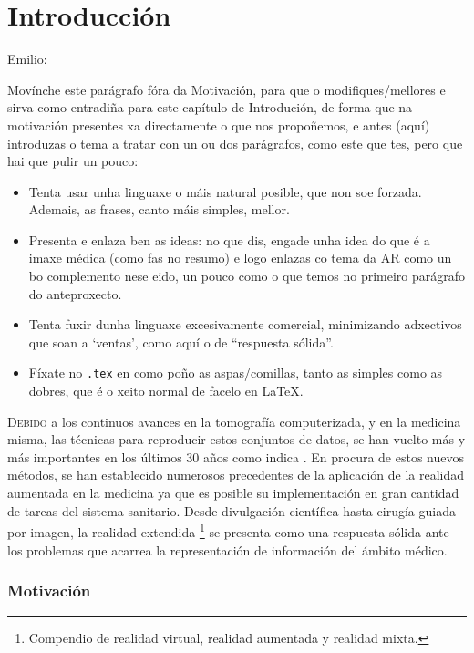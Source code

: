 \chapter{Introducción}
\label{chap:introducion}

{\color{red} Emilio:}
{\color{gray} Movínche este parágrafo fóra da Motivación, para que o
  modifiques/mellores e sirva como entradiña para este capítulo de
  Introdución, de forma que na motivación presentes xa directamente o
  que nos propoñemos, e antes (aquí) introduzas o tema a tratar con un
  ou dos parágrafos, como este que tes, pero que hai que pulir un
  pouco:
  \begin{itemize}
  \item Tenta usar unha linguaxe o máis natural posible, que non soe
    forzada. Ademais, as frases, canto máis simples, mellor.
  \item Presenta e enlaza ben as ideas: no que dis, engade unha idea
    do que é a imaxe médica (como fas no resumo) e logo enlazas co
    tema da AR como un bo complemento nese eido, un pouco como o que
    temos no primeiro parágrafo do anteproxecto.
  \item Tenta fuxir dunha linguaxe excesivamente comercial,
    minimizando adxectivos que soan a `ventas', como aquí o de
    ``respuesta sólida''.
  \item Fíxate no {\tt .tex} en como poño as aspas/comillas, tanto as
    simples como as dobres, que é o xeito normal de facelo en \LaTeX.
  \end{itemize}
}

\lettrine{D}{ebido} a los continuos avances en la tomografía computerizada, y en la medicina misma, las técnicas para reproducir estos conjuntos de datos, se han vuelto más y más importantes en los últimos 30 años como indica \cite{Botha2014}. En procura de estos nuevos métodos, se han establecido numerosos precedentes de la aplicación de la realidad aumentada en la medicina \cite{Sielhorst2008} ya que es posible su implementación en gran cantidad de tareas del sistema sanitario. Desde divulgación científica hasta cirugía guiada por imagen, la realidad extendida \footnote{Compendio de realidad virtual, realidad aumentada y realidad mixta.} se presenta como una respuesta sólida ante los problemas que acarrea la representación de información del ámbito médico.


\subsection{Motivación}

